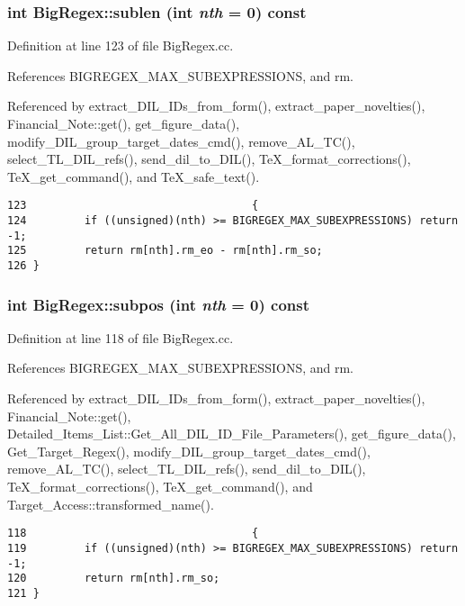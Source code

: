 \subsubsection{\setlength{\rightskip}{0pt plus 5cm}int Big\-Regex::sublen (int {\em nth} = 0) const}\label{classBigRegex_a6}




Definition at line 123 of file Big\-Regex.cc.

References BIGREGEX\_\-MAX\_\-SUBEXPRESSIONS, and rm.

Referenced by extract\_\-DIL\_\-IDs\_\-from\_\-form(), extract\_\-paper\_\-novelties(), Financial\_\-Note::get(), get\_\-figure\_\-data(), modify\_\-DIL\_\-group\_\-target\_\-dates\_\-cmd(), remove\_\-AL\_\-TC(), select\_\-TL\_\-DIL\_\-refs(), send\_\-dil\_\-to\_\-DIL(), Te\-X\_\-format\_\-corrections(), Te\-X\_\-get\_\-command(), and Te\-X\_\-safe\_\-text().



\footnotesize\begin{verbatim}123                                   {
124         if ((unsigned)(nth) >= BIGREGEX_MAX_SUBEXPRESSIONS) return -1;
125         return rm[nth].rm_eo - rm[nth].rm_so;
126 }
\end{verbatim}\normalsize 
{}
\subsubsection{\setlength{\rightskip}{0pt plus 5cm}int Big\-Regex::subpos (int {\em nth} = 0) const}\label{classBigRegex_a5}




Definition at line 118 of file Big\-Regex.cc.

References BIGREGEX\_\-MAX\_\-SUBEXPRESSIONS, and rm.

Referenced by extract\_\-DIL\_\-IDs\_\-from\_\-form(), extract\_\-paper\_\-novelties(), Financial\_\-Note::get(), Detailed\_\-Items\_\-List::Get\_\-All\_\-DIL\_\-ID\_\-File\_\-Parameters(), get\_\-figure\_\-data(), Get\_\-Target\_\-Regex(), modify\_\-DIL\_\-group\_\-target\_\-dates\_\-cmd(), remove\_\-AL\_\-TC(), select\_\-TL\_\-DIL\_\-refs(), send\_\-dil\_\-to\_\-DIL(), Te\-X\_\-format\_\-corrections(), Te\-X\_\-get\_\-command(), and Target\_\-Access::transformed\_\-name().



\footnotesize\begin{verbatim}118                                   {
119         if ((unsigned)(nth) >= BIGREGEX_MAX_SUBEXPRESSIONS) return -1;
120         return rm[nth].rm_so;
121 }
\end{verbatim}\normalsize 


